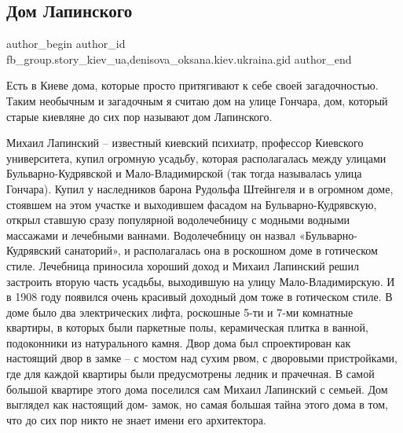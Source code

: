  
 
 
 
 
 
\subsection{Дом Лапинского}
\label{sec:06_09_2021.fb.fb_group.story_kiev_ua.1.dom_lapinskogo}
 
\ifcmt
 author_begin
   author_id fb_group.story_kiev_ua,denisova_oksana.kiev.ukraina.gid
 author_end
\fi

Есть в Киеве дома, которые просто притягивают к себе своей загадочностью. Таким
необычным и загадочным я считаю дом на улице Гончара, дом, который старые
киевляне до сих пор называют дом Лапинского.


Михаил Лапинский – известный киевский психиатр, профессор Киевского
университета, купил огромную усадьбу, которая располагалась между улицами
Бульварно-Кудрявской и Мало-Владимирской (так тогда называлась улица Гончара).
Купил у наследников барона Рудольфа Штейнгеля и в огромном доме, стоявшем на
этом участке и выходившем фасадом на Бульварно-Кудрявскую, открыл ставшую сразу
популярной водолечебницу с модными водными массажами и лечебными ваннами.
Водолечебницу он назвал «Бульварно-Кудрявский санаторий»,  и располагалась она
в роскошном доме в готическом стиле. Лечебница приносила хороший доход и
Михаил Лапинский решил застроить вторую часть усадьбы, выходившую на улицу
Мало-Владимирскую. И в 1908 году появился очень красивый доходный дом тоже в
готическом стиле. В доме  было два электрических лифта, роскошные 5-ти и 7-ми
комнатные квартиры, в которых были  паркетные полы, керамическая плитка в
ванной, подоконники из натурального камня. Двор дома был спроектирован как
настоящий двор в замке – с мостом над сухим рвом, с дворовыми пристройками, где
для каждой квартиры были предусмотрены ледник и прачечная. В самой большой
квартире этого дома поселился сам Михаил Лапинский с семьей. Дом выглядел как
настоящий дом- замок, но самая большая тайна этого дома в том, что до сих пор
никто не знает имени его архитектора.

